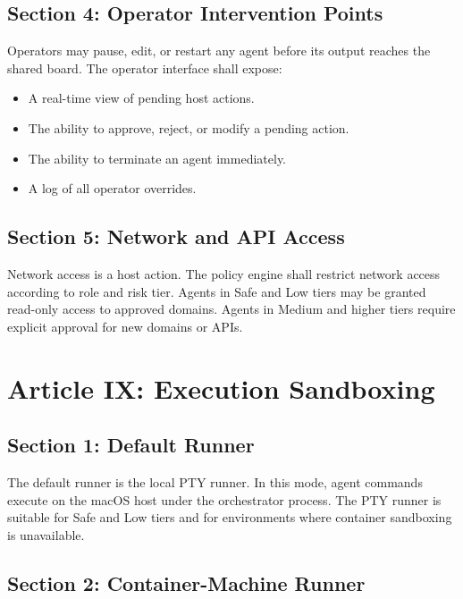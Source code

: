 \documentclass[12pt,letterpaper]{article}
\begin{document}
\subsection{Section 4: Operator Intervention Points}

Operators may pause, edit, or restart any agent before its output reaches the shared board. The operator interface shall expose:

\begin{itemize}
    \item A real-time view of pending host actions.
    \item The ability to approve, reject, or modify a pending action.
    \item The ability to terminate an agent immediately.
    \item A log of all operator overrides.
\end{itemize}

\subsection{Section 5: Network and API Access}

Network access is a host action. The policy engine shall restrict network access according to role and risk tier. Agents in Safe and Low tiers may be granted read-only access to approved domains. Agents in Medium and higher tiers require explicit approval for new domains or APIs.

\section{Article IX: Execution Sandboxing}
\label{art:sandboxing}

\subsection{Section 1: Default Runner}

The default runner is the local PTY runner. In this mode, agent commands execute on the macOS host under the orchestrator process. The PTY runner is suitable for Safe and Low tiers and for environments where container sandboxing is unavailable.

\subsection{Section 2: Container-Machine Runner}
\end{document}
